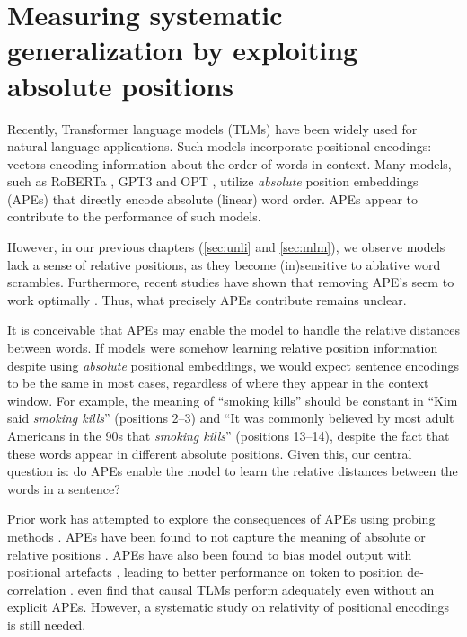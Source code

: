 \documentclass[letterpaper, 12pt]{report}
\begin{document}
\clearpage
\chapter{Measuring systematic generalization by exploiting absolute positions}
\label{sec:pos}

Recently, Transformer \citep{vaswani2017} language models (TLMs) have been widely used for natural language applications. Such models incorporate positional encodings: vectors encoding information about the order of words in context. Many models, such as RoBERTa \citep{Liu2019:RoBERTa}, GPT3 \citep{Brown2020:GPT3} and OPT \citep{Zhang2022:OPT}, utilize \textit{absolute} position embeddings (APEs) that directly encode absolute (linear) word order. APEs appear to contribute to the performance of such models.

However, in our previous chapters (\autoref{sec:unli} and \autoref{sec:mlm}), we observe models lack a sense of relative positions, as they become (in)sensitive to ablative word scrambles. Furthermore, recent studies have shown that removing APE's seem to work optimally \citep{haviv2022}. Thus, what precisely APEs contribute remains unclear.

It is conceivable that APEs may enable the model to handle the relative distances between words. %
If models were somehow learning relative position information despite using \emph{absolute} positional embeddings, we would expect sentence encodings to be the same in most cases, regardless of where they appear in the context window. For example, the meaning of ``smoking kills'' should be constant in ``Kim said \textit{smoking kills}'' (positions 2--3)  and ``It was commonly believed by most adult Americans in the 90s that \textit{smoking kills}'' (positions 13--14), despite the fact that these words appear in different absolute positions.
Given this, our central question is: do APEs enable the model to learn the relative distances between the words in a sentence?

Prior work has attempted to explore the consequences of APEs using probing methods \citep{wang2021on}.
APEs have been found to not capture the meaning of absolute or relative positions \citep{wang-chen-2020-position}.
APEs have also been found to bias model output with positional artefacts \citep{luo-etal-2021-positional}, leading to better performance on token to position de-correlation \citep{ke2021}.
\citet{haviv2022} even find that causal TLMs perform adequately even without an explicit APEs.
However, a systematic study on relativity of positional encodings is still needed.
\end{document}
